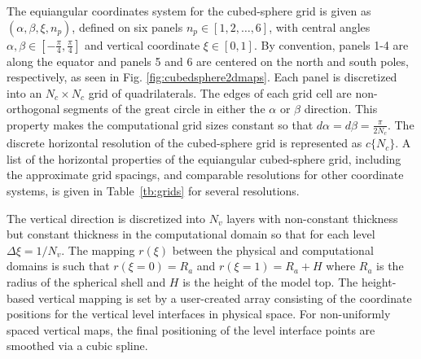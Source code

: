 The equiangular coordinates system for the 
cubed-sphere grid is given as $(\alpha, \beta, \xi, n_p)$, defined
on six panels $n_p \in [1,2,\dots, 6]$, with central angles $\alpha, \beta \in [-\frac{\pi}{4},\frac{\pi}{4}]$ and 
vertical coordinate $\xi \in [0,1]$. By convention, panels 1-4 are along the 
equator and panels 5 and 6 are centered on the north and south poles,
respectively, as seen in Fig. \ref{fig:cubedsphere2dmaps}. 
Each panel is discretized into an $N_c \times N_c$ grid of quadrilaterals.
The edges of each grid cell are non-orthogonal 
segments of the great circle in either the $\alpha$ or $\beta$ direction. 
This property makes the computational grid sizes constant so that
$d\alpha = d\beta = \frac{\pi}{2N_c}$. 
The discrete horizontal resolution of the cubed-sphere grid is represented as  $c\{N_c\}$.
A list of the horizontal properties of the equiangular cubed-sphere grid, including the
approximate grid spacings, and comparable resolutions for other coordinate systems, is given in
Table~\ref{tb:grids} for several resolutions.

The vertical direction is discretized into $N_v$ layers 
with non-constant thickness but constant thickness in the 
computational domain so that for each level $\Delta \xi = 1/N_v$.
The mapping $r(\xi)$ between the physical and computational 
domains is such that
$r(\xi=0) = R_a$ and $r(\xi=1) = R_a + H$ where $R_a$ is the radius of 
the spherical shell and $H$ is the height of the model top. 
The height-based vertical mapping is set by a user-created 
array consisting of the coordinate positions for the vertical level interfaces in physical space.
For non-uniformly spaced vertical maps, the final positioning of the 
level interface points are smoothed via a cubic spline.


